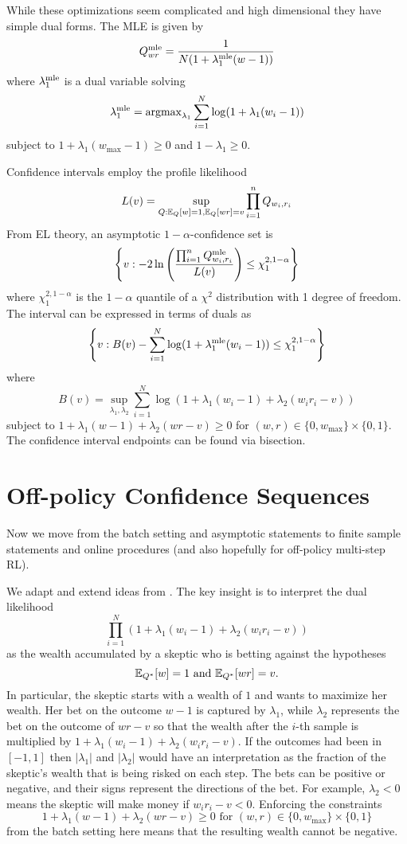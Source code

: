 While these optimizations seem complicated and 
high dimensional they have simple dual forms. 
The MLE is given by 
\[
Q^{\textrm{mle}}_{wr} = \frac{1}{N(1+\lambda_1^{\textrm{mle}}(w-1))}
\]
where $\lambda_1^{\textrm{mle}}$ is a dual variable solving
\[
\lambda_1^{\textrm{mle}} = \operatorname{argmax}_{\lambda_1} \sum_{i=1}^N \log(1+\lambda_1(w_i-1))
\]
subject to $1+\lambda_1(w_{\max}-1)\geq 0$
and $1-\lambda_1\geq 0$.

Confidence intervals employ the profile likelihood
\[
L(v)=\sup_{Q: \mathbb{E}_Q[w]=1, \mathbb{E}_Q[wr]=v} \prod_{i=1}^n Q_{w_i,r_i}
\]
From EL theory, an asymptotic 
$1-\alpha$-confidence set is 
\[
\left\{v: -2\ln\left(\frac{\prod_{i=1}^n Q^{\textrm{mle}}_{w_i,r_i}}{L(v)}\right)
\leq \chi_1^{2,1-\alpha}\right\}
\]
where $\chi_1^{2,1-\alpha}$ is the $1-\alpha$ quantile of a $\chi^2$
distribution with 1 degree of freedom.
The interval can be expressed in terms of duals as
\[
\left\{v: 
B(v)-\sum_{i=1}^N\log(1+\lambda_1^{\textrm{mle}}(w_i-1))
\leq \chi_1^{2,1-\alpha}\right\}
\]
where
\[
B(v) = \sup_{\lambda_1,\lambda_2} \sum_{i=1}^N \log(1+\lambda_1(w_i-1)+\lambda_2(w_i r_i -v))
\]
subject to $1+\lambda_1(w-1)+\lambda_2(wr-v)\geq 0$
for $(w,r) \in \{0,w_{\max}\}\times \{0,1\}$.
The confidence interval endpoints can be found via 
bisection.

\section{Off-policy Confidence Sequences}
Now we move from the batch setting and asymptotic statements to 
finite sample statements and online procedures (and also 
hopefully for off-policy multi-step RL).

We adapt and extend ideas from \cite{waudby-smith_variance-adaptive_2020}.
The key insight is to interpret the dual likelihood
\[
\prod_{i=1}^N (1+\lambda_1(w_i-1)+\lambda_2(w_i r_i - v))
\]
as the wealth accumulated by a skeptic who is betting against the
hypotheses 
\[
\mathbb{E}_{Q^*}[w]=1 \text{ and } \mathbb{E}_{Q^*}[wr]=v.
\]
In particular,
the skeptic starts with a wealth of $1$ and wants to 
maximize her wealth. Her bet on the outcome $w-1$ is captured by $\lambda_1$, while $\lambda_2$
represents the bet on the outcome of $wr-v$ so that the wealth after
the $i$-th sample is multiplied by $1+\lambda_1(w_i-1)+\lambda_2 (w_i r_i -v)$. If the outcomes had been in $[-1,1]$ then
$|\lambda_1|$ and $|\lambda_2|$ would have an interpretation as 
the fraction of the skeptic's wealth that is being risked 
on each step. The bets can be positive
or negative, and their signs represent the directions of the bet. For example, $\lambda_2<0$ means 
the skeptic will make money if $w_ir_i-v<0$.
Enforcing the constraints 
\[
1+\lambda_{1} (w-1)+\lambda_{2} (wr-v)\geq 0 
\textrm{ for } (w,r) \in \{0,w_{\max}\}\times\{0,1\}
\]
from the batch setting here means that 
the resulting wealth cannot be negative.

